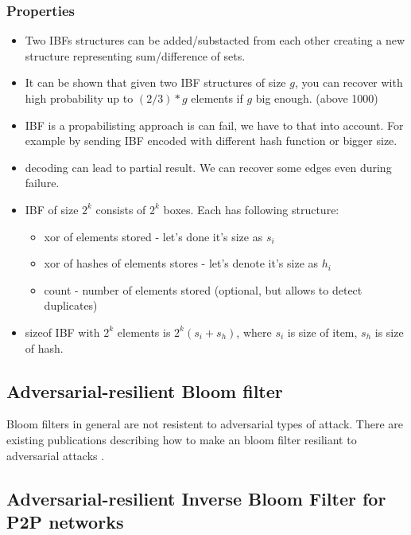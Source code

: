 \documentclass[11pt]{article}
\begin{document}
\subsubsection{Properties}
\begin{itemize}
\item Two IBFs structures can be added/substacted from each other creating a new structure representing sum/difference of sets.
\item It can be shown that given two IBF structures of size $g$, you can recover with high probability up to $(2/3)*g$ elements if $g$ big enough. (above 1000)  \cite{esrwpc}
\item IBF is a propabilisting approach is can fail, we have to that into account. For example by sending IBF encoded with different hash function or bigger size.
\item decoding can lead to partial result. We can recover some edges even during failure.
\item IBF of size $2^k$ consists of $2^k$ boxes. Each has following structure:
\begin{itemize}
\item xor of elements stored -  let's done it's size as $s_i$
\item xor of hashes of elements stores - let's denote it's size as $h_i$
\item count - number of elements stored (optional, but allows to detect duplicates)
\end{itemize}
\item sizeof IBF with $2^k$ elements is $2^k(s_i + s_h)$, where $s_i$ is size of item, $s_h$ is size of hash.
\end{itemize}


\subsection{Adversarial-resilient Bloom filter}
Bloom filters in general are not resistent to adversarial types of attack.
There are existing publications describing how to make an bloom filter resiliant to adversarial attacks \cite{adversarial}.

\subsection{Adversarial-resilient Inverse Bloom Filter for P2P networks}
\end{document}
